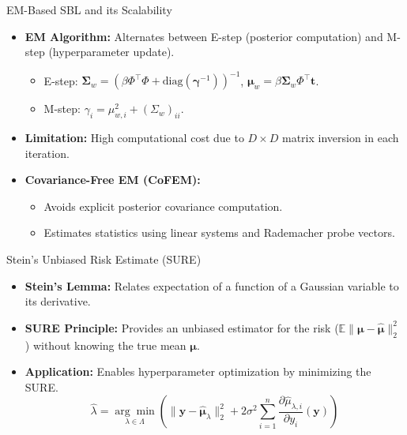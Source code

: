 \documentclass{beamer}
\begin{document}
\begin{frame}{EM-Based SBL and its Scalability}
    \begin{itemize}
        \item \textbf{EM Algorithm:} Alternates between E-step (posterior computation) and M-step (hyperparameter update). 
            \begin{itemize}
                \item E-step: $\boldsymbol{\Sigma}_w = \left( \beta \Phi^\top \Phi + \mathrm{diag}(\boldsymbol{\gamma}^{-1}) \right)^{-1}$, $\boldsymbol{\mu}_w = \beta \boldsymbol{\Sigma}_w \Phi^\top \mathbf{t}$. 
                \item M-step: $\gamma_i = \mu_{w,i}^2 + (\Sigma_w)_{ii}$. 
            \end{itemize}
        \item \textbf{Limitation:} High computational cost due to $D \times D$ matrix inversion in each iteration. 
        \item \textbf{Covariance-Free EM (CoFEM):}
            \begin{itemize}
                \item Avoids explicit posterior covariance computation. 
                \item Estimates statistics using linear systems and Rademacher probe vectors. 
            \end{itemize}
    \end{itemize}
\end{frame}

\begin{frame}{Stein's Unbiased Risk Estimate (SURE)}
    \begin{itemize}
        \item \textbf{Stein's Lemma:} Relates expectation of a function of a Gaussian variable to its derivative. 
        \item \textbf{SURE Principle:} Provides an unbiased estimator for the risk ($\mathbb{E}\|\boldsymbol{\mu} - \boldsymbol{\hat{\mu}}\|_2^2$) without knowing the true mean $\boldsymbol{\mu}$. 
        \item \textbf{Application:} Enables hyperparameter optimization by minimizing the SURE. 
            \begin{equation*}
                \hat{\lambda} = \underset{\lambda \in \Lambda}{\arg\min} \left( \|\mathbf{y} - \boldsymbol{\hat{\mu}}_\lambda\|_2^2 + 2\sigma^2 \sum_{i=1}^n \frac{\partial \hat{\mu}_{\lambda,i}}{\partial y_i}(\mathbf{y}) \right) \label{eq:SURE_opt}
            \end{equation*}
    \end{itemize}
\end{frame}
\end{document}
